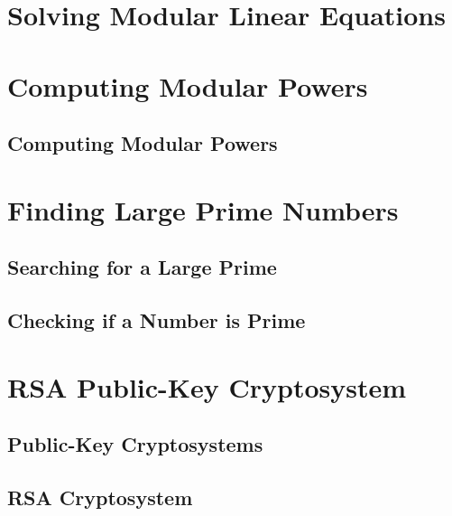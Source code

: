 \documentclass{beamer}
\begin{document}

\section{Solving Modular Linear Equations}


\section{Computing Modular Powers}

\subsection{Computing Modular Powers}

\section{Finding Large Prime Numbers}

\subsection{Searching for a Large Prime}

\subsection{Checking if a Number is Prime}

\section{RSA Public-Key Cryptosystem}


\subsection{Public-Key Cryptosystems}

\subsection{RSA Cryptosystem}
\end{document}
